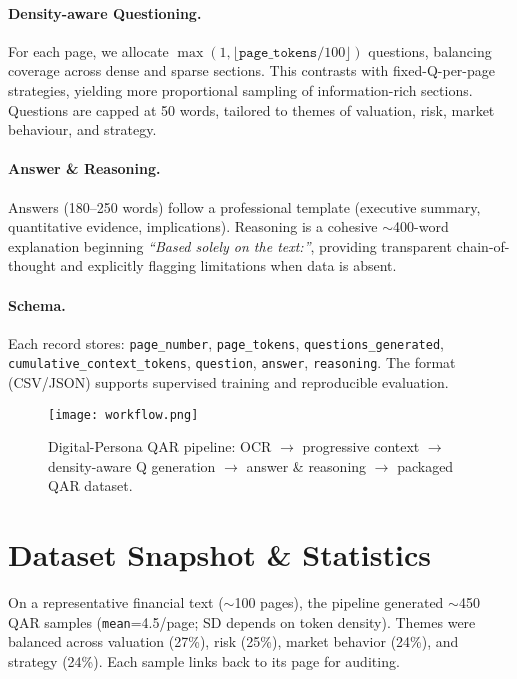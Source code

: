 \documentclass[sigconf,authordraft,anonymous]{acmart}
\begin{document}
\paragraph{Density-aware Questioning.}
For each page, we allocate $\max(1, \lfloor \texttt{page\_tokens}/100 \rfloor)$ questions, balancing coverage across dense and sparse sections. This contrasts with fixed-Q-per-page strategies, yielding more proportional sampling of information-rich sections. Questions are capped at 50 words, tailored to themes of valuation, risk, market behaviour, and strategy.

\paragraph{Answer \& Reasoning.}
Answers (180--250 words) follow a professional template (executive summary, quantitative evidence, implications). Reasoning is a cohesive $\sim$400-word explanation beginning \emph{``Based solely on the text:''}, providing transparent chain-of-thought and explicitly flagging limitations when data is absent.

\paragraph{Schema.}
Each record stores: \texttt{page\_number}, \texttt{page\_tokens}, \texttt{questions\_generated}, \texttt{cumulative\_context\_tokens}, \texttt{question}, \texttt{answer}, \texttt{reasoning}. The format (CSV/JSON) supports supervised training and reproducible evaluation.

\begin{figure}[t]
  \centering
  \texttt{[image: workflow.png]}
  \caption{Digital-Persona QAR pipeline: OCR $\rightarrow$ progressive context $\rightarrow$ density-aware Q generation $\rightarrow$ answer \& reasoning $\rightarrow$ packaged QAR dataset.}
  \label{fig:workflow}
\end{figure}

\section{Dataset Snapshot \& Statistics}
On a representative financial text ($\sim$100 pages), the pipeline generated $\sim$450 QAR samples (\texttt{mean}=4.5/page; SD depends on token density). Themes were balanced across valuation (27\%), risk (25\%), market behavior (24\%), and strategy (24\%). Each sample links back to its page for auditing.
\end{document}
